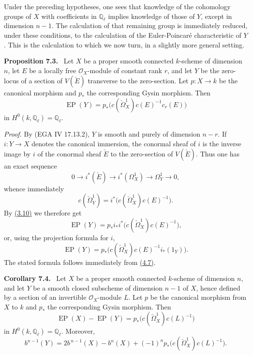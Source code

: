 \documentclass[11pt]{article}
\newenvironment{statement}[1]{\par\medskip\noindent\textbf{#1.}\ }{\par\medskip}
\begin{document}
Under the preceding hypotheses, one sees that knowledge of the cohomology groups of $X$ with coefficients in $\mathbb Q_\ell$ implies knowledge of those of $Y$, except in dimension $n-1$. The calculation of that remaining group is immediately reduced, under these conditions, to the calculation of the Euler-Poincaré characteristic of $Y$. This is the calculation to which we now turn, in a slightly more general setting.

\label{sga5:VII:proposition:7.3}\begin{statement}{Proposition 7.3}
Let $X$ be a proper smooth connected $k$-scheme of dimension $n$, let $E$ be a locally free $\mathcal O_X$-module of constant rank $r$, and let $Y$ be the zero-locus of a section of $V(\check E)$ transverse to the zero-section. Let $p:X\to k$ be the canonical morphism and $p_*$ the corresponding Gysin morphism. Then
\[
\operatorname{EP}(Y)=p_*\bigl(c(\check\Omega_X^1)c(E)^{-1}c_r(E)\bigr)
\]
in $H^0(k,\mathbb Q_\ell)=\mathbb Q_\ell$.
\end{statement}

\emph{Proof.} By (EGA IV 17.13.2), $Y$ is smooth and purely of dimension $n-r$. If $i:Y\to X$ denotes the canonical immersion, the conormal sheaf of $i$ is the inverse image by $i$ of the conormal sheaf $\check E$ to the zero-section of $V(\check E)$. Thus one has an exact sequence
\[
0\to i^*(\check E)\to i^*(\Omega_X^1)\to\Omega_Y^1\to0,
\tag{7.3.1}\label{sga5:VII:equation:7.3.1}
\]
whence immediately
\[
c(\check\Omega_Y^1)=i^*\bigl(c(\check\Omega_X^1)c(E)^{-1}\bigr).
\tag{7.3.2}\label{sga5:VII:equation:7.3.2}
\]
By \hyperref[sga5:VII:corollary:4.9]{(3.10)} we therefore get
\[
\operatorname{EP}(Y)=p_*i_*i^*\bigl(c(\check\Omega_X^1)c(E)^{-1}\bigr),
\]
or, using the projection formula for $i$,
\[
\operatorname{EP}(Y)=p_*\bigl(c(\check\Omega_X^1)c(E)^{-1}i_*(1_Y)\bigr).
\]
The stated formula follows immediately from \hyperref[sga5:VII:corollary:4.7]{(4.7)}.

\label{sga5:VII:corollary:7.4}\begin{statement}{Corollary 7.4}
Let $X$ be a proper smooth connected $k$-scheme of dimension $n$, and let $Y$ be a smooth closed subscheme of dimension $n-1$ of $X$, hence defined by a section of an invertible $\mathcal O_X$-module $L$. Let $p$ be the canonical morphism from $X$ to $k$ and $p_*$ the corresponding Gysin morphism. Then
\[
\operatorname{EP}(X)-\operatorname{EP}(Y)=p_*\bigl(c(\check\Omega_X^1)c(L)^{-1}\bigr)
\tag{7.4.1}\label{sga5:VII:equation:7.4.1}
\]
in $H^0(k,\mathbb Q_\ell)=\mathbb Q_\ell$. Moreover,
\[
b^{n-1}(Y)=2b^{\,n-1}(X)-b^n(X)+(-1)^n p_*\bigl(c(\check\Omega_X^1)c(L)^{-1}\bigr).
\tag{7.4.2}\label{sga5:VII:equation:7.4.2}
\]
\end{statement}
\end{document}
